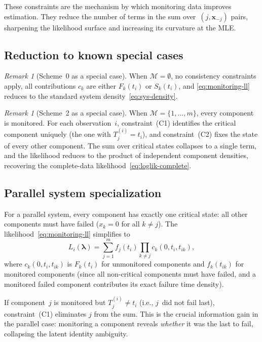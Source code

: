\documentclass[12pt]{article}
\theoremstyle{definition}
\theoremstyle{remark}
\newtheorem{remark}[theorem]{Remark}
\newcommand{\blam}{\boldsymbol{\lambda}}
\begin{document}
These constraints are the mechanism by which monitoring data improves
estimation.  They reduce the number of terms in the sum
over~$(j, \mathbf{x}_{-j})$ pairs, sharpening the likelihood
surface and increasing its curvature at the MLE.

\subsection{Reduction to known special cases}
\label{sec:special-cases}

\begin{remark}[Scheme~0 as a special case]
When $\mathcal{M} = \emptyset$, no consistency constraints apply, all
contributions $c_k$ are either $F_k(t_i)$ or $S_k(t_i)$, and
\eqref{eq:monitoring-ll} reduces to the standard system
density~\eqref{eq:sys-density}.
\end{remark}

\begin{remark}[Scheme~2 as a special case]
When $\mathcal{M} = \{1, \ldots, m\}$, every component is monitored.
For each observation~$i$, constraint~(C1) identifies the critical
component uniquely (the one with $T_j^{(i)} = t_i$), and
constraint~(C2) fixes the state of every other component.  The sum
over critical states collapses to a single term, and the likelihood
reduces to the product of independent component densities, recovering
the complete-data likelihood~\eqref{eq:loglik-complete}.
\end{remark}

\subsection{Parallel system specialization}
\label{sec:parallel-ll}

For a parallel system, every component has exactly one critical state:
all other components must have failed ($x_k = 0$ for all $k \neq j$).
The likelihood~\eqref{eq:monitoring-ll} simplifies to
\begin{equation}\label{eq:parallel-monitoring-ll}
  L_i(\blam) = \sum_{j=1}^{m} f_j(t_i) \prod_{k \neq j} c_k(0, t_i, t_{ik}),
\end{equation}
where $c_k(0, t_i, t_{ik})$ is $F_k(t_i)$ for unmonitored components
and $f_k(t_{ik})$ for monitored components (since all non-critical
components must have failed, and a monitored failed component
contributes its exact failure time density).

If component~$j$ is monitored but $T_j^{(i)} \neq t_i$ (i.e., $j$~did
not fail last), constraint~(C1) eliminates $j$ from the sum.  This is
the crucial information gain in the parallel case: monitoring a
component reveals \emph{whether} it was the last to fail, collapsing
the latent identity ambiguity.
\end{document}
